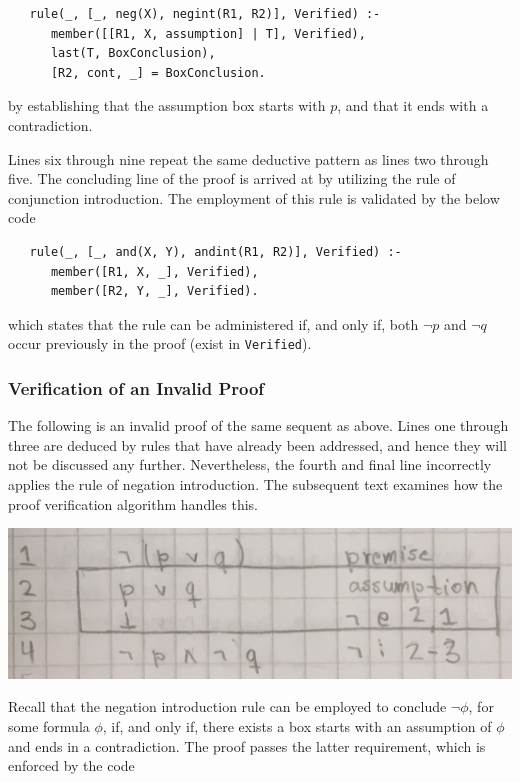 \documentclass[a4paper, 11pt]{article}
\begin{document}
\begin{verbatim}
   rule(_, [_, neg(X), negint(R1, R2)], Verified) :-
      member([[R1, X, assumption] | T], Verified),
      last(T, BoxConclusion),
      [R2, cont, _] = BoxConclusion.
\end{verbatim}

   by establishing that the assumption box starts
   with $p$, and that it ends with a contradiction.
   \bigbreak

   Lines six through nine repeat the 
   same deductive pattern as lines two through five.
   The concluding line of the proof is arrived at by
   utilizing the rule of conjunction introduction.
   The employment of this rule is validated by the
   below code

\begin{verbatim}
   rule(_, [_, and(X, Y), andint(R1, R2)], Verified) :-
      member([R1, X, _], Verified),
      member([R2, Y, _], Verified).
\end{verbatim}

   which states that the rule can be administered if,
   and only if, both $\neg p$ and $\neg q$ occur
   previously in the proof (exist in
   \texttt{Verified}).

   \subsubsection{Verification of an Invalid Proof}
   
   The following is an invalid proof of the same sequent as
   above. Lines one through three are deduced by rules that 
   have already been addressed, and hence they will not be 
   discussed any further. Nevertheless, the fourth and final 
   line incorrectly applies the rule of negation introduction.
   The subsequent text examines how the proof verification 
   algorithm handles this.

   \includegraphics[scale=0.25]{de-morgan-invalid}
   
   Recall that the negation introduction rule can be employed
   to conclude $\neg \phi$, for some formula $\phi$, if, and 
   only if, there exists a box starts with an assumption of
   $\phi$ and ends in a contradiction. The proof passes the
   latter requirement, which is enforced by the code
\end{document}
